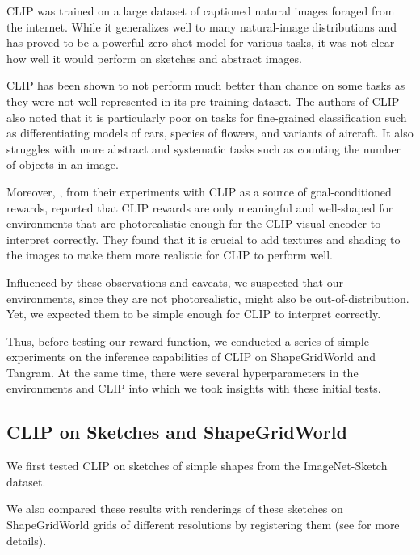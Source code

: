 CLIP was trained on a large dataset of captioned natural images foraged from the internet.
While it generalizes well to many natural-image distributions and has proved to be a powerful zero-shot model for various tasks, it was not clear how well it would perform on sketches and abstract images. 

CLIP has been shown to not perform much better than chance on some tasks as they were not well represented in its pre-training dataset.
The authors of CLIP also noted that it is particularly poor on tasks for fine-grained classification such as differentiating models of cars, species of flowers, and variants of aircraft.
It also struggles with more abstract and systematic tasks such as counting the number of objects in an image.

Moreover, \cite{vlmrm}, from their experiments with CLIP as a source of goal-conditioned rewards, reported that CLIP rewards are only meaningful and well-shaped for environments that are photorealistic enough for the CLIP visual encoder to interpret correctly.
They found that it is crucial to add textures and shading to the images to make them more realistic for CLIP to perform well.

Influenced by these observations and caveats, we suspected that our environments, since they are not photorealistic, might also be out-of-distribution. 
Yet, we expected them to be simple enough for CLIP to interpret correctly.

Thus, before testing our reward function, we conducted a series of simple experiments on the inference capabilities of CLIP on ShapeGridWorld and Tangram.
At the same time, there were several hyperparameters in the environments and CLIP into which we took insights with these initial tests.


\subsection{CLIP on Sketches and ShapeGridWorld}
\label{sec:clip-sketches}

We first tested CLIP on sketches of simple shapes from the ImageNet-Sketch \cite{imagenet} dataset.

We also compared these results with renderings of these sketches on ShapeGridWorld grids of different resolutions by registering them (see  for more details).

